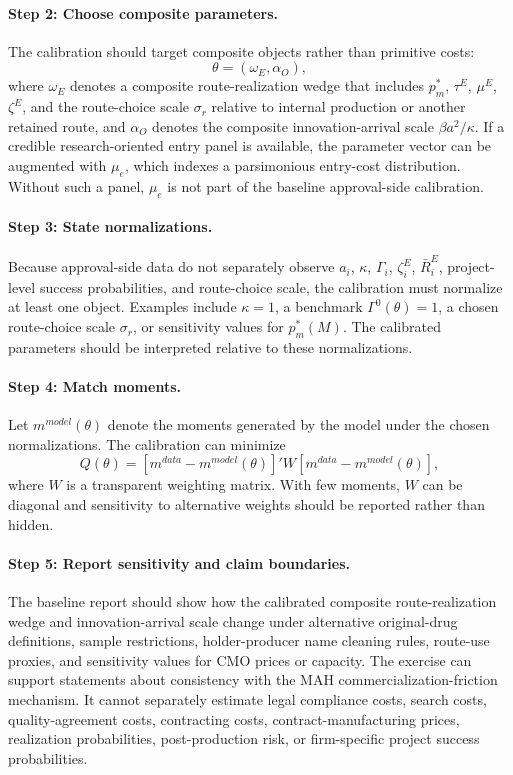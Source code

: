 \documentclass[12pt]{article}
\newcommand{\1}{\mathbf{1}}
\begin{document}
\paragraph{Step 2: Choose composite parameters.}
The calibration should target composite objects rather than primitive costs:
\[
\theta
=
\left(
\omega_E,\alpha_O
\right),
\]
where $\omega_E$ denotes a composite route-realization wedge that includes $p_m^*$, $\tau^E$, $\mu^E$, $\zeta^E$, and the route-choice scale $\sigma_r$ relative to internal production or another retained route, and $\alpha_O$ denotes the composite innovation-arrival scale $\beta a^2/\kappa$. If a credible research-oriented entry panel is available, the parameter vector can be augmented with $\mu_e$, which indexes a parsimonious entry-cost distribution. Without such a panel, $\mu_e$ is not part of the baseline approval-side calibration.

\paragraph{Step 3: State normalizations.}
Because approval-side data do not separately observe $a_i$, $\kappa$, $\Gamma_i$, $\zeta_i^E$, $\bar R_i^E$, project-level success probabilities, and route-choice scale, the calibration must normalize at least one object. Examples include $\kappa=1$, a benchmark $\Gamma^0(\theta)=1$, a chosen route-choice scale $\sigma_r$, or sensitivity values for $p_m^*(M)$. The calibrated parameters should be interpreted relative to these normalizations.

\paragraph{Step 4: Match moments.}
Let $m^{model}(\theta)$ denote the moments generated by the model under the chosen normalizations. The calibration can minimize
\begin{equation}
Q(\theta)
=
\left[m^{data}-m^{model}(\theta)\right]'W
\left[m^{data}-m^{model}(\theta)\right],
\label{eq:calib_objective}
\end{equation}
where $W$ is a transparent weighting matrix. With few moments, $W$ can be diagonal and sensitivity to alternative weights should be reported rather than hidden.

\paragraph{Step 5: Report sensitivity and claim boundaries.}
The baseline report should show how the calibrated composite route-realization wedge and innovation-arrival scale change under alternative original-drug definitions, sample restrictions, holder-producer name cleaning rules, route-use proxies, and sensitivity values for CMO prices or capacity. The exercise can support statements about consistency with the MAH commercialization-friction mechanism. It cannot separately estimate legal compliance costs, search costs, quality-agreement costs, contracting costs, contract-manufacturing prices, realization probabilities, post-production risk, or firm-specific project success probabilities.
\end{document}
